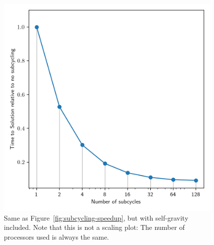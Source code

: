 \begin{figure}
    \centering
\includegraphics[width=.6\textwidth]{figures/RHD/subcycling/subcycles-speedup-stromgren-gravity.png}
    \caption{
Same as Figure~\ref{fig:subcycling-speedup}, but with self-gravity included. Note that this is not a
scaling plot: The number of processors used is always the same.
    }
    \label{fig:subcycling-speedup-gravity}
\end{figure}


